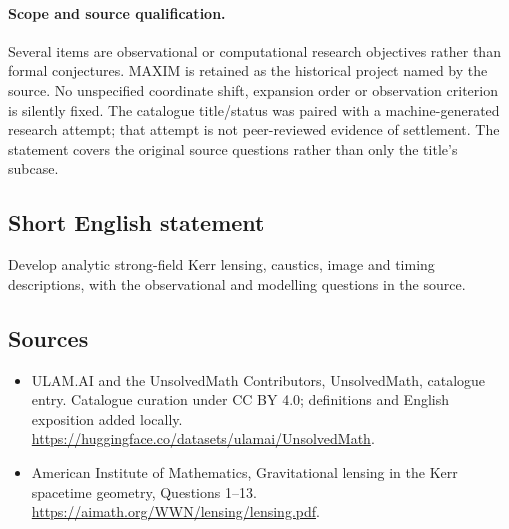 \documentclass[11pt]{article}
\begin{document}
\paragraph{Scope and source qualification.}Several items are observational or computational research objectives rather than formal conjectures. MAXIM is retained as the historical project named by the source. No unspecified coordinate shift, expansion order or observation criterion is silently fixed. The catalogue title/status was paired with a machine-generated research attempt; that attempt is not peer-reviewed evidence of settlement. The statement covers the original source questions rather than only the title’s subcase.
\subsection{Short English statement}
Develop analytic strong-field Kerr lensing, caustics, image and timing descriptions, with the observational and modelling questions in the source.
\subsection{Sources}
\begin{itemize}
\item[\hypertarget{source:statement:1}{S1}] ULAM.AI and the UnsolvedMath Contributors, UnsolvedMath, catalogue entry. Catalogue curation under CC BY 4.0; definitions and English exposition added locally.
\url{https://huggingface.co/datasets/ulamai/UnsolvedMath}.
\item[\hypertarget{source:statement:2}{S2}] American Institute of Mathematics, Gravitational lensing in the Kerr spacetime geometry, Questions 1–13.
\url{https://aimath.org/WWN/lensing/lensing.pdf}.
\end{itemize}
\label{end:statement}
\end{document}
